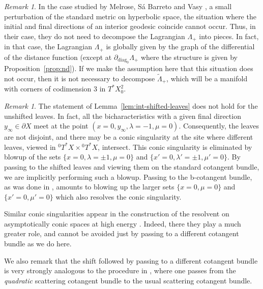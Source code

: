 \documentclass[10pt, a4paper, twoside]{amsart}
\numberwithin{equation}{section}
\theoremstyle{remark}
\newtheorem{remark}[theorem]{Remark}
\begin{document}
\begin{remark}\label{rem:comparison} In the case studied by Melrose, S\'{a} Barreto and Vasy \cite{Melrose-Sa Barreto-Vasy}, a small perturbation of the standard metric on hyperbolic space, the situation where the initial and final directions of an interior geodesic coincide cannot occur. Thus, in their case, they do not need to decompose the Lagrangian $\Lambda_+$ into pieces. In fact, in that case, the Lagrangian $\Lambda_+$ is globally given by the graph of the differential of the distance function (except at $\partial_{\mathrm{diag}_0} \Lambda_+$ where the structure is given by Proposition~\ref{prop:nd}). If we make the assumption here that this situation does not occur, then it is not necessary to decompose ${\tilde \Lambda}_+$, which will be a manifold with corners of codimension 3 in $T^* X^2_0$. 
\end{remark}

\begin{remark}\label{rem:conicsing} The statement of Lemma~\ref{lem:int-shifted-leaves} does not hold for the unshifted leaves. In fact, all the bicharacteristics with a given final direction $y_\infty \in \partial X$ meet at the point $(x=0, y_\infty, \lambda = -1, \mu = 0)$. Consequently, the leaves are not disjoint, and there may be a conic singularity at the site where different leaves, viewed in ${}^0 T^* X \times {}^0 T^* X$,  intersect. This conic singularity is eliminated by blowup of the sets $\{ x = 0, \lambda = \pm 1, \mu = 0\}$ and $\{ x' = 0, \lambda' = \pm 1, \mu' = 0\}$. By passing to the shifted leaves and viewing them on the standard cotangent bundle, we are implicitly performing such a blowup. Passing to the b-cotangent bundle, as was done in \cite{Melrose-Sa Barreto-Vasy}, amounts to blowing up the larger sets $\{ x = 0,  \mu = 0\}$ and $\{ x' = 0,  \mu' = 0\}$ which also resolves the conic singularity. 

Similar conic singularities appear in the construction of the resolvent on asymptotically conic spaces at high energy \cite{Hassell-Wunsch}. Indeed, there they play a much greater role, and cannot be avoided just by passing to a different cotangent bundle as we do here. 

We also remark that the shift followed by passing to a different cotangent bundle is very strongly analogous to the procedure in \cite[Lemma 3.3]{Hassell-Wunsch-2005},
where one passes from the \emph{quadratic} scattering cotangent bundle to the usual  scattering cotangent bundle. 
\end{remark}
\end{document}
